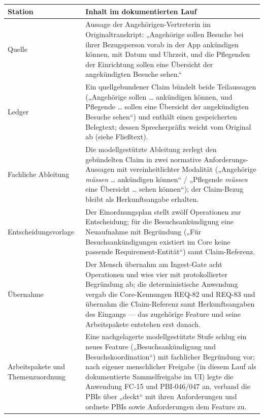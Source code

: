 
\begin{table}[htbp]
  \centering
  \small
  \begin{tabular}{>{\raggedright\arraybackslash}p{}>{\raggedright\arraybackslash}p{}}
    \hline
    \textbf{Station} & \textbf{Inhalt im dokumentierten Lauf} \\
    \hline
    Quelle & Aussage der Angehörigen-Vertreterin im Originaltranskript: „Angehörige sollen Besuche bei ihrer Bezugsperson vorab in der App ankündigen können, mit Datum und Uhrzeit, und die Pflegenden der Einrichtung sollen eine Übersicht der angekündigten Besuche sehen.`` \\
    Ledger & Ein quellgebundener Claim bündelt beide Teilaussagen („Angehörige sollen \ldots{} ankündigen können, und Pflegende \ldots{} sollen eine Übersicht der angekündigten Besuche sehen``) und enthält einen gespeicherten Belegtext; dessen Sprecherpräfix weicht vom Original ab (siehe Fließtext). \\
    Fachliche Ableitung & Die modellgestützte Ableitung zerlegt den gebündelten Claim in zwei normative Anforderungs-Aussagen mit vereinheitlichter Modalität („Angehörige \emph{müssen} \ldots{} ankündigen können`` / „Pflegende \emph{müssen} eine Übersicht \ldots{} sehen können``); der Claim-Bezug bleibt als Herkunftsangabe erhalten. \\
    Entscheidungsvorlage & Der Einordnungsplan stellt zwölf Operationen zur Entscheidung; für die Besuchsankündigung eine Neuaufnahme mit Begründung („Für Besuchsankündigungen existiert im Core keine passende Requirement-Entität``) samt Claim-Referenz. \\
    Übernahme & Der Mensch übernahm am Ingest-Gate acht Operationen und wies vier mit protokollierter Begründung ab; die deterministische Anwendung vergab die Core-Kennungen REQ-82 und REQ-83 und übernahm die Claim-Referenz samt Herkunftsangaben des Eingangs --- das zugehörige Feature und seine Arbeitspakete entstehen erst danach. \\
    Arbeitspakete und Themenzuordnung & Eine nachgelagerte modellgestützte Stufe schlug ein neues Feature („Besuchsankündigung und Besuchskoordination``) mit fachlicher Begründung vor; nach eigener menschlicher Freigabe (in diesem Lauf als dokumentierte Sammelfreigabe im UI) legte die Anwendung FC-15 und PBI-046/047 an, verband die PBIs über „deckt`` mit ihren Anforderungen und ordnete PBIs sowie Anforderungen dem Feature zu. \\

\end{tabular}
\end{table}
